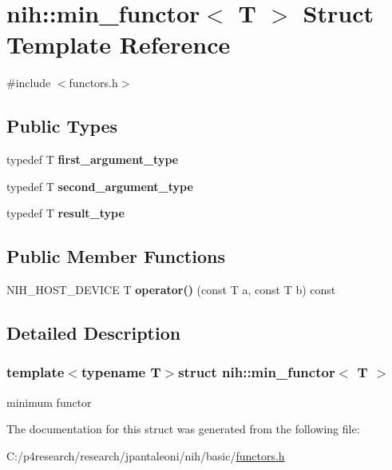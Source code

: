 \hypertarget{structnih_1_1min__functor}{
\section{nih\-:\-:min\-\_\-functor$<$ \-T $>$ \-Struct \-Template \-Reference}
\label{structnih_1_1min__functor}
}


{\ttfamily \#include $<$functors.\-h$>$}

\subsection*{\-Public \-Types}
\begin{DoxyCompactItemize}
\item 
\hypertarget{structnih_1_1min__functor_a2f365fa19cb299f99ecad0124fc5b501}{
typedef \-T {\bfseries first\-\_\-argument\-\_\-type}}
\label{structnih_1_1min__functor_a2f365fa19cb299f99ecad0124fc5b501}

\item 
\hypertarget{structnih_1_1min__functor_aa107bf1a2da2057cf7bdf2d1ce869a1c}{
typedef \-T {\bfseries second\-\_\-argument\-\_\-type}}
\label{structnih_1_1min__functor_aa107bf1a2da2057cf7bdf2d1ce869a1c}

\item 
\hypertarget{structnih_1_1min__functor_aef38714e1f2aa83e4eeb5bbea98a1163}{
typedef \-T {\bfseries result\-\_\-type}}
\label{structnih_1_1min__functor_aef38714e1f2aa83e4eeb5bbea98a1163}

\end{DoxyCompactItemize}
\subsection*{\-Public \-Member \-Functions}
\begin{DoxyCompactItemize}
\item 
\hypertarget{structnih_1_1min__functor_acf7486fd39195f1bc88a8e368aebf45e}{
\-N\-I\-H\-\_\-\-H\-O\-S\-T\-\_\-\-D\-E\-V\-I\-C\-E \-T {\bfseries operator()} (const \-T a, const \-T b) const }
\label{structnih_1_1min__functor_acf7486fd39195f1bc88a8e368aebf45e}

\end{DoxyCompactItemize}


\subsection{\-Detailed \-Description}
\subsubsection*{template$<$typename T$>$struct nih\-::min\-\_\-functor$<$ T $>$}

minimum functor 

\-The documentation for this struct was generated from the following file\-:\begin{DoxyCompactItemize}
\item 
\-C\-:/p4research/research/jpantaleoni/nih/basic/\hyperlink{functors_8h}{functors.\-h}\end{DoxyCompactItemize}
